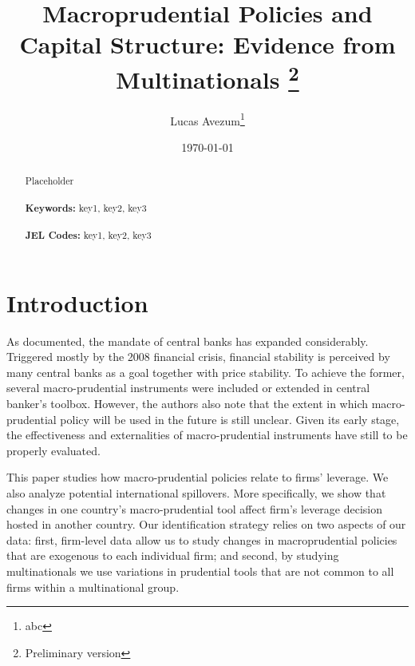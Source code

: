 \documentclass[12pt]{article}
\begin{document}
	
	\begin{titlepage}
		\title{Macroprudential Policies and Capital Structure: Evidence from Multinationals \thanks{Preliminary version}}
		\author{Lucas Avezum\thanks{abc}}
		\date{\today}
		\maketitle
		\begin{abstract}
			\noindent Placeholder\\
			\vspace{0in}\\
			\noindent\textbf{Keywords:} key1, key2, key3\\
			\vspace{0in}\\
			\noindent\textbf{JEL Codes:} key1, key2, key3\\
			
			\bigskip
		\end{abstract}
		\setcounter{page}{0}
		\thispagestyle{empty}
	\end{titlepage}
	\pagebreak \newpage
	
	
	
	
	\doublespacing
	
	
	\section{Introduction} \label{sec:introduction}
	As \cite*{blinder2016necessity} documented, the mandate of central banks has expanded considerably. Triggered mostly by the 2008 financial crisis, financial stability is perceived by many central banks as a goal together with price stability. To achieve the former, several macro-prudential instruments were included or extended in central banker's toolbox. However, the authors also note that the extent in which macro-prudential policy will be used in the future is still unclear. Given its early stage, the effectiveness and externalities of macro-prudential instruments have still to be properly evaluated. 
	
	This paper studies how macro-prudential policies relate to firms' leverage. We also analyze potential international spillovers. More specifically, we show that changes in one country's macro-prudential tool affect firm's leverage decision hosted in another country. Our identification strategy relies on two aspects of our data: first, firm-level data allow us to study changes in macroprudential policies that are exogenous to each individual firm; and second, by studying multinationals we use variations in prudential tools that are not common to all firms within a multinational group.
	
\end{document}
